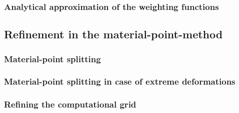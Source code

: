 \subsubsection{Analytical approximation of the weighting functions}
\label{sec:analyt-appr-weight}


\subsection{Refinement in the material-point-method}
\label{sec:refin-mater-point}

\subsubsection{Material-point splitting}
\label{sec:mater-point-splitt}

\subsubsection{Material-point splitting in case of extreme
  deformations}
\label{sec:mater-point-splitt-1}

\subsubsection{Refining the computational grid}
\label{sec:refin-comp-grid}



